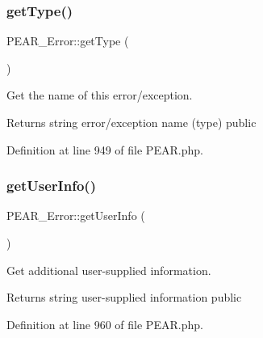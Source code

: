 \hypertarget{classPEAR__Error_acebd26397af611328c6a7125cbc6284b}{}\label{classPEAR__Error_acebd26397af611328c6a7125cbc6284b} 
\subsubsection{\texorpdfstring{get\+Type()}{getType()}}
{\footnotesize\ttfamily P\+E\+A\+R\+\_\+\+Error\+::get\+Type (\begin{DoxyParamCaption}{ }\end{DoxyParamCaption})}

Get the name of this error/exception.

\begin{DoxyReturn}{Returns}
string error/exception name (type)  public 
\end{DoxyReturn}


Definition at line 949 of file P\+E\+A\+R.\+php.

\hypertarget{classPEAR__Error_a3933a88dc76b37aace3c333ce91f8560}{}\label{classPEAR__Error_a3933a88dc76b37aace3c333ce91f8560} 
\subsubsection{\texorpdfstring{get\+User\+Info()}{getUserInfo()}}
{\footnotesize\ttfamily P\+E\+A\+R\+\_\+\+Error\+::get\+User\+Info (\begin{DoxyParamCaption}{ }\end{DoxyParamCaption})}

Get additional user-\/supplied information.

\begin{DoxyReturn}{Returns}
string user-\/supplied information  public 
\end{DoxyReturn}


Definition at line 960 of file P\+E\+A\+R.\+php.

\hypertarget{classPEAR__Error_a32ede8c5a867a74af0970772eccdebef}{}\label{classPEAR__Error_a32ede8c5a867a74af0970772eccdebef} 
